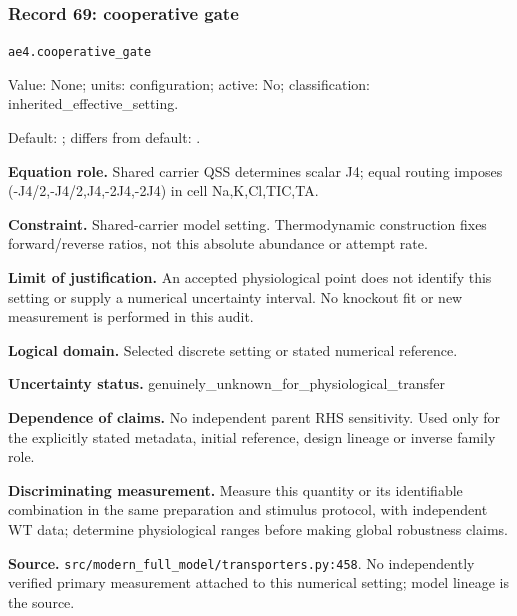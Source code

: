 \subsubsection*{Record 69: cooperative gate}
{\small \nolinkurl{ae4.cooperative_gate}\par

Value: None; units: configuration; active: No; classification: inherited\_effective\_setting.\par

Default: ; differs from default: .\par

\textbf{Equation role.} Shared carrier QSS determines scalar J4; equal routing imposes (-J4/2,-J4/2,J4,-2J4,-2J4) in cell Na,K,Cl,TIC,TA.\par

\textbf{Constraint.} Shared-carrier model setting. Thermodynamic construction fixes forward/reverse ratios, not this absolute abundance or attempt rate.\par

\textbf{Limit of justification.} An accepted physiological point does not identify this setting or supply a numerical uncertainty interval. No knockout fit or new measurement is performed in this audit.\par

\textbf{Logical domain.} Selected discrete setting or stated numerical reference.\par

\textbf{Uncertainty status.} genuinely\_unknown\_for\_physiological\_transfer\par

\textbf{Dependence of claims.} No independent parent RHS sensitivity. Used only for the explicitly stated metadata, initial reference, design lineage or inverse family role.\par

\textbf{Discriminating measurement.} Measure this quantity or its identifiable combination in the same preparation and stimulus protocol, with independent WT data; determine physiological ranges before making global robustness claims.\par

\textbf{Source.} \nolinkurl{src/modern_full_model/transporters.py:458}. No independently verified primary measurement attached to this numerical setting; model lineage is the source.\par}

